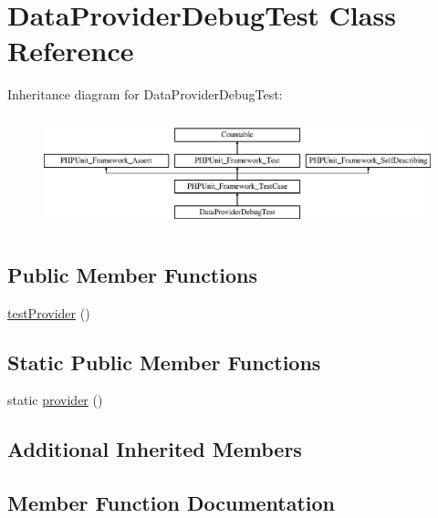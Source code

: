 \hypertarget{class_data_provider_debug_test}{}\section{Data\+Provider\+Debug\+Test Class Reference}
\label{class_data_provider_debug_test}
Inheritance diagram for Data\+Provider\+Debug\+Test\+:\begin{figure}[H]
\begin{center}
\leavevmode
\includegraphics[height=3.303835cm]{class_data_provider_debug_test}
\end{center}
\end{figure}
\subsection*{Public Member Functions}
\begin{DoxyCompactItemize}
\item 
\mbox{\hyperlink{class_data_provider_debug_test_ac12be755ed10e7681d5d49644582cc05}{test\+Provider}} ()
\end{DoxyCompactItemize}
\subsection*{Static Public Member Functions}
\begin{DoxyCompactItemize}
\item 
static \mbox{\hyperlink{class_data_provider_debug_test_ad7ead77e5832b8da3f71dec2dac5ce66}{provider}} ()
\end{DoxyCompactItemize}
\subsection*{Additional Inherited Members}


\subsection{Member Function Documentation}
\mbox{\label{class_data_provider_debug_test_ad7ead77e5832b8da3f71dec2dac5ce66}} 
